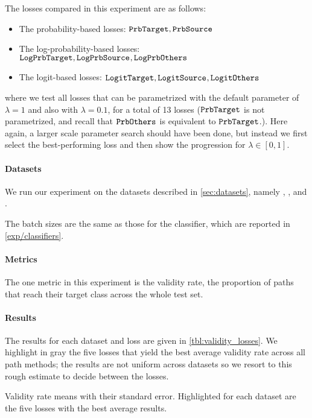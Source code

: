\documentclass[../main.tex]{subfiles}
\begin{document}
The losses compared in this experiment are as follows:
\begin{itemize}
    \item The probability-based losses: $\mathtt{PrbTarget}, \mathtt{PrbSource}_{}$
    \item The log-probability-based losses: $\mathtt{LogPrbTarget}, \mathtt{LogPrbSource}_{}, \mathtt{LogPrbOthers}_{}$
    \item The logit-based losses: $\mathtt{LogitTarget}, \mathtt{LogitSource}_{}, \mathtt{LogitOthers}_{}$
\end{itemize}
where we test all losses that can be parametrized with the default parameter of $\lambda = 1$ and also with $\lambda = 0.1$, for a total of 13 losses ($\mathtt{PrbTarget}$ is not parametrized, and recall that $\mathtt{PrbOthers}_{}$ is equivalent to $\mathtt{PrbTarget}$.).
Here again, a larger scale parameter search should have been done, but instead we first select the best-performing loss and then show the progression for $\lambda \in [0, 1]$.

\paragraph{Datasets}

We run our experiment on the datasets described in \autoref{sec:datasets}, namely \CakeOnSea, \ForestCover, \WineQuality{} and \OnlineNewsPopularity.

The batch sizes are the same as those for the classifier, which are reported in \autoref{exp/classifiers}.

\paragraph{Metrics}

The one metric in this experiment is the validity rate, \ie{} the proportion of paths that reach their target class across the whole test set.

\paragraph{Results}

The results for each dataset and loss are given in \autoref{tbl:validity_losses}.
We highlight in gray the five losses that yield the best average validity rate across all path methods; the results are not uniform across datasets so we resort to this rough estimate to decide between the losses.

\begin{table}[H]
    \centering
    
    \caption{Validity rate means with their standard error. Highlighted for each dataset are the five losses with the best average results.}
    \label{tbl:validity_losses}
\end{table}
\end{document}
